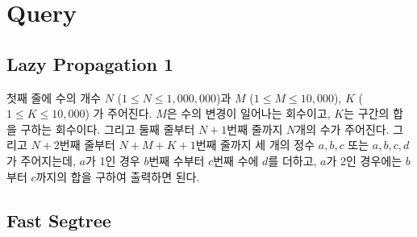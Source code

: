 \documentclass[10pt,landscape,a4paper,twocolumn]{article}
\begin{document}
\section{Query}
%
%
%
%
%
%
%
%
%
%
%

\subsection{Lazy Propagation 1}

\textsf{
	첫째 줄에 수의 개수 $ N $ ($ 1 \leq N \leq 1,000,000 $)과 $ M $ ($ 1 \leq M \leq 10,000 $), $ K $ ($ 1 \leq K \leq 10,000 $) 가 주어진다.
	$ M $은 수의 변경이 일어나는 회수이고, $ K $는 구간의 합을 구하는 회수이다.
	그리고 둘째 줄부터 $ N+1 $번째 줄까지 $ N $개의 수가 주어진다.
	그리고 $ N+2 $번째 줄부터 $ N+M+K+1 $번째 줄까지
	세 개의 정수 $ a, b, c $ 또는 $ a, b, c, d $가 주어지는데,
	$ a $가 1인 경우 $ b $번째 수부터 $ c $번째 수에 $ d $를 더하고,
	$ a $가 2인 경우에는 $ b $부터 $ c $까지의 합을 구하여 출력하면 된다.
}




\subsection{Fast Segtree}

\end{document}
